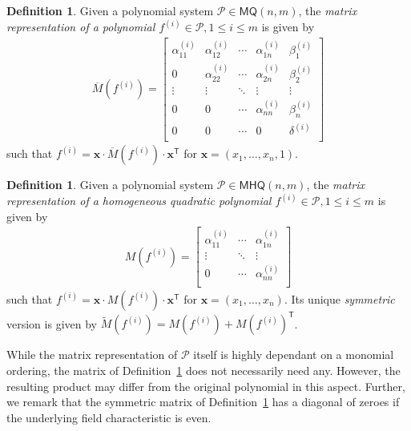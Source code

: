 \documentclass[english]{ufsc-thesis-rn46-2019/ufsc-thesis-rn46-2019}
\theoremstyle{definition}
\newtheorem{definition}[theorem]{Definition}
\begin{document}
\begin{definition}\label{def:poly-mat-repr}
  Given a polynomial system $\mathcal{P} \in \textsf{MQ}(n, m)$, the
  \emph{matrix representation of a polynomial
  $f^{(i)} \in \mathcal{P}, 1 \leq i \leq m$} is given by
  \begin{align}
    \overline{M}(f^{(i)}) =
    \begin{bmatrix}
      \alpha^{(i)}_{11} & \alpha^{(i)}_{12}
        & \cdots & \alpha^{(i)}_{1n} & \beta^{(i)}_{1} \\
      0                 & \alpha^{(i)}_{22}
        & \cdots & \alpha^{(i)}_{2n} & \beta^{(i)}_{2} \\
      \vdots            & \vdots
        & \ddots & \vdots            & \vdots          \\
      0                 & 0
        & \cdots & \alpha^{(i)}_{nn} & \beta^{(i)}_{n} \\
      0                 & 0
        & \cdots & 0                 & \delta^{(i)}    \\
    \end{bmatrix}
  \end{align}
  such that
  $f^{(i)} = \mathbf{x} \cdot \overline{M}(f^{(i)})
    \cdot \mathbf{x}^{\textsf{T}}$ for $\mathbf{x} = (x_{1}, \dots, x_{n}, 1)$.
\end{definition}

\begin{definition}\label{def:quad-poly-mat-repr}
  Given a polynomial system $\mathcal{P} \in \textsf{MHQ}(n, m)$, the
  \emph{matrix representation of a homogeneous quadratic polynomial
  $f^{(i)} \in \mathcal{P}, 1 \leq i \leq m$} is given by
  \begin{align}
    M(f^{(i)}) =
    \begin{bmatrix}
      \alpha^{(i)}_{11} & \cdots & \alpha^{(i)}_{1n} \\
      \vdots            & \ddots & \vdots            \\
      0                 & \cdots & \alpha^{(i)}_{nn} \\
    \end{bmatrix}
  \end{align}
  such that
  $f^{(i)} = \mathbf{x} \cdot M(f^{(i)}) \cdot \mathbf{x}^{\textsf{T}}$ for
  $\mathbf{x} = (x_{1}, \dots, x_{n})$. Its unique \emph{symmetric} version is
  given by ${\widetilde{M}(f^{(i)}) = M(f^{(i)}) + M(f^{(i)})}^{\mathsf{T}}$.
\end{definition}

While the matrix representation of $\mathcal{P}$ itself is highly dependant on
a monomial ordering, the matrix of Definition~\ref{def:poly-mat-repr} does not
necessarily need any. However, the resulting product may differ from the
original polynomial in this aspect. Further, we remark that the symmetric
matrix of Definition~\ref{def:quad-poly-mat-repr} has a diagonal of zeroes if
the underlying field characteristic is even.
\end{document}
